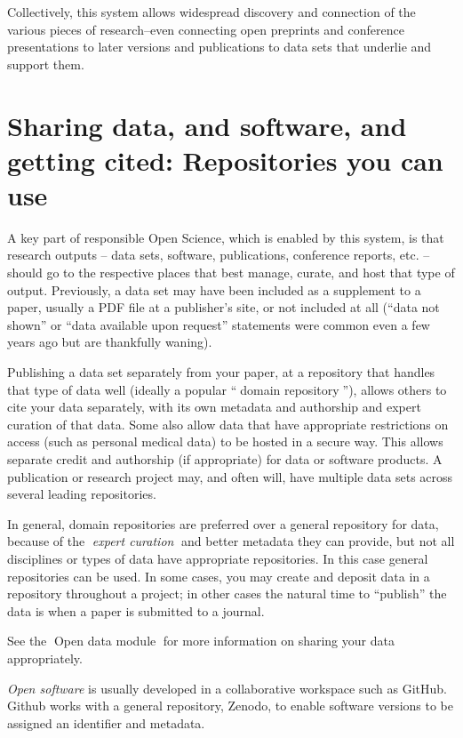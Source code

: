 \documentclass[
  letterpaper,
  DIV=11,
  numbers=noendperiod]{scrreport}
\begin{document}
Collectively, this system allows widespread discovery and connection of
the various pieces of research--even connecting open preprints and
conference presentations to later versions and publications to data sets
that underlie and support them.

\hypertarget{sharing-data-and-software-and-getting-cited-repositories-you-can-use}{%
\section{Sharing data, and software, and getting cited: Repositories you
can
use}\label{sharing-data-and-software-and-getting-cited-repositories-you-can-use}}

A key part of responsible Open Science, which is enabled by this system,
is that research outputs -- data sets, software, publications,
conference reports, etc. -- should go to the respective places that best
manage, curate, and host that type of output. Previously, a data set may
have been included as a supplement to a paper, usually a PDF file at a
publisher's site, or not included at all (``data not shown'' or ``data
available upon request'' statements were common even a few years ago but
are thankfully waning).

Publishing a data set separately from your paper, at a repository that
handles that type of data well (ideally a popular ``📖domain
repository📖''), allows others to cite your data separately, with its
own metadata and authorship and expert curation of that data. Some also
allow data that have appropriate restrictions on access (such as
personal medical data) to be hosted in a secure way. This allows
separate credit and authorship (if appropriate) for data or software
products. A publication or research project may, and often will, have
multiple data sets across several leading repositories.

In general, domain repositories are preferred over a general repository
for data, because of the \emph{📖expert curation📖} and better metadata
they can provide, but not all disciplines or types of data have
appropriate repositories. In this case general repositories can be used.
In some cases, you may create and deposit data in a repository
throughout a project; in other cases the natural time to ``publish'' the
data is when a paper is submitted to a journal.

See the 🔗Open data module🔗 for more information on sharing your data
appropriately.

\emph{Open software} is usually developed in a collaborative workspace
such as GitHub. Github works with a general repository, Zenodo, to
enable software versions to be assigned an identifier and metadata.
\end{document}
